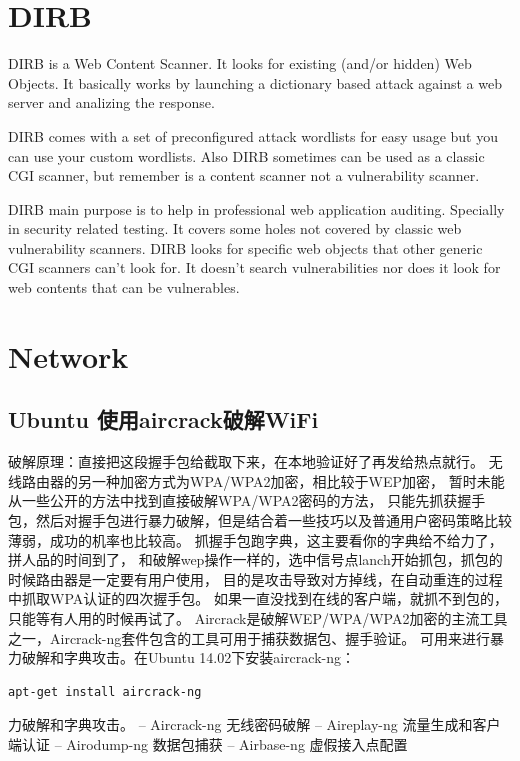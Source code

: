 \documentclass{book}
\begin{document}
\section{DIRB}

DIRB is a Web Content Scanner. It looks for existing (and/or hidden) Web 
Objects. It basically works by launching a dictionary based attack against 
a web server and analizing the response.

DIRB comes with a set of preconfigured attack wordlists for easy usage but 
you can use your custom wordlists. Also DIRB sometimes can be used as a 
classic CGI scanner, but remember is a content scanner not a vulnerability 
scanner.

DIRB main purpose is to help in professional web application auditing. 
Specially in security related testing. It covers some holes not covered by 
classic web vulnerability scanners. DIRB looks for specific web objects that 
other generic CGI scanners can't look for. It doesn't search vulnerabilities 
nor does it look for web contents that can be vulnerables.

\section{Network}

\subsection{Ubuntu 使用aircrack破解WiFi}

破解原理：直接把这段握手包给截取下来，在本地验证好了再发给热点就行。
无线路由器的另一种加密方式为WPA/WPA2加密，相比较于WEP加密，
暂时未能从一些公开的方法中找到直接破解WPA/WPA2密码的方法，
只能先抓获握手包，然后对握手包进行暴力破解，但是结合着一些技巧以及普通用户密码策略比较薄弱，成功的机率也比较高。
抓握手包跑字典，这主要看你的字典给不给力了，拼人品的时间到了，
和破解wep操作一样的，选中信号点lanch开始抓包，抓包的时候路由器是一定要有用户使用，
目的是攻击导致对方掉线，在自动重连的过程中抓取WPA认证的四次握手包。
如果一直没找到在线的客户端，就抓不到包的，只能等有人用的时候再试了。
Aircrack是破解WEP/WPA/WPA2加密的主流工具之一，Aircrack-ng套件包含的工具可用于捕获数据包、握手验证。
可用来进行暴力破解和字典攻击。在Ubuntu 14.02下安装aircrack-ng：

\begin{lstlisting}[language=Bash]
apt-get install aircrack-ng
\end{lstlisting}

力破解和字典攻击。
– Aircrack-ng 无线密码破解
– Aireplay-ng 流量生成和客户端认证
– Airodump-ng 数据包捕获
– Airbase-ng  虚假接入点配置
\end{document}
